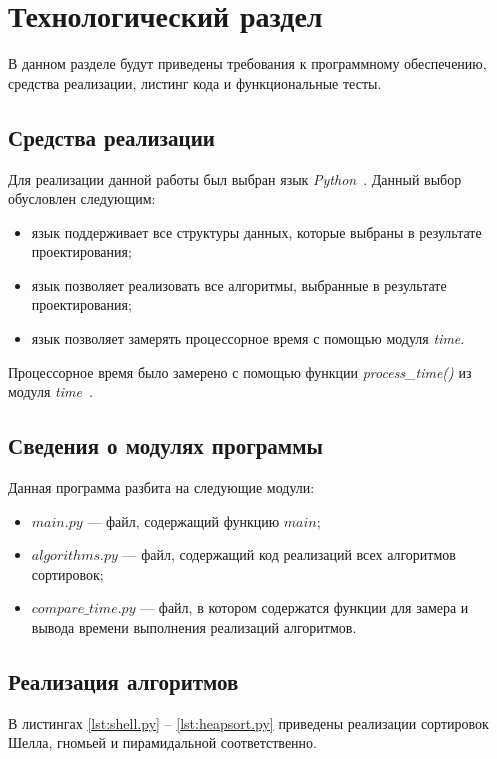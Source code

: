 \chapter{Технологический раздел}

В данном разделе будут приведены требования к программному обеспечению, средства реализации, листинг кода и функциональные тесты.


\section{Средства реализации}

Для реализации данной работы был выбран язык \textit{Python}~\cite{python}.
Данный выбор обусловлен следующим:
\begin{itemize}
	\item язык поддерживает все структуры данных, которые выбраны в результате проектирования;
	\item язык позволяет реализовать все алгоритмы, выбранные в результате проектирования;
	\item язык позволяет замерять процессорное время с помощью модуля \textit{time}. 
\end{itemize}

Процессорное время было замерено с помощью функции \textit{process\_time()} из модуля \textit{time}~\cite{python-time}.

\section{Сведения о модулях программы}

Данная программа разбита на следующие модули:
\begin{itemize}
	\item $main.py$ --- файл, содержащий функцию $main$;
	\item $algorithms.py$ --- файл, содержащий код реализаций всех алгоритмов сортировок;
	\item $compare\_time.py$ --- файл, в котором содержатся функции для замера и вывода времени выполнения реализаций алгоритмов.
\end{itemize}

\section{Реализация алгоритмов}

В листингах \ref{lst:shell.py} -- \ref{lst:heapsort.py} приведены реализации сортировок Шелла, гномьей и пирамидальной соответственно.

